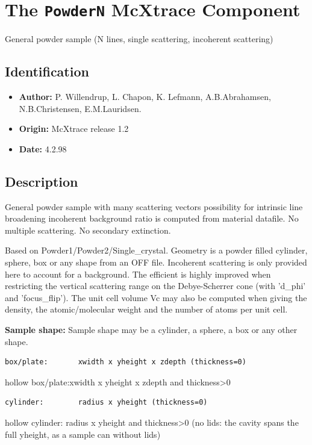 \section{The \texttt{PowderN} McXtrace Component}
General powder sample (N lines, single scattering, incoherent scattering)

\subsection*{Identification}
\begin{itemize}
  \item \textbf{Author:} P. Willendrup, L. Chapon, K. Lefmann, A.B.Abrahamsen, N.B.Christensen, E.M.Lauridsen.
  \item \textbf{Origin:} McXtrace release 1.2
  \item \textbf{Date:} 4.2.98
\end{itemize}

\subsection*{Description}
General powder sample with many scattering vectors possibility for intrinsic line broadening incoherent background ratio is computed from material datafile. No multiple scattering. No secondary extinction.

Based on Powder1/Powder2/Single\_crystal. Geometry is a powder filled cylinder, sphere, box or any shape from an OFF file. Incoherent scattering is only provided here to account for a background. The efficient is highly improved when restricting the vertical scattering range on the Debye-Scherrer cone (with 'd\_phi' and 'focus\_flip'). The unit cell volume Vc may also be computed when giving the density, the atomic/molecular weight and the number of atoms per unit cell.

\textbf{Sample shape:} Sample shape may be a cylinder, a sphere, a box or any other shape.

\begin{verbatim}
box/plate:       xwidth x yheight x zdepth (thickness=0)
\end{verbatim}

hollow box/plate:xwidth x yheight x zdepth and thickness\textgreater{}0

\begin{verbatim}
cylinder:        radius x yheight (thickness=0)
\end{verbatim}

hollow cylinder: radius x yheight and thickness\textgreater{}0 (no lids: the cavity spans the full yheight, as a sample can without lids)

